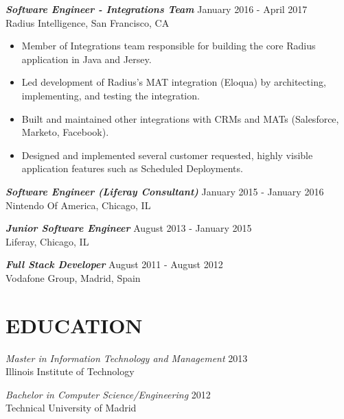 \documentclass[overlapped, 10pt]{res} %
\begin{document}
\begin{resume}
{\sl \textbf{Software Engineer - Integrations Team}} \hfill January 2016 - April 2017 \\
Radius Intelligence, San Francisco, CA
\begin{itemize} \itemsep -2pt %
\item Member of Integrations team responsible for building the core Radius application in Java and Jersey.
\item Led development of Radius’s MAT integration (Eloqua) by architecting, implementing, and testing the integration.
\item Built and maintained other integrations with CRMs and MATs (Salesforce, Marketo, Facebook).
\item Designed and implemented several customer requested, highly visible application features such as Scheduled Deployments.
\end{itemize}
 
{\sl \textbf{Software Engineer (Liferay Consultant)}} \hfill January 2015 - January 2016 \\
Nintendo Of America, Chicago, IL

{\sl \textbf{Junior Software Engineer}} \hfill August 2013 - January 2015 \\
Liferay, Chicago, IL

{\sl \textbf{Full Stack Developer}} \hfill August 2011 - August 2012 \\
Vodafone Group, Madrid, Spain

 
\section{EDUCATION}\smallskip

{\sl Master in Information Technology and Management} \hfill 2013 \\
Illinois Institute of Technology

{\sl Bachelor in Computer Science/Engineering} \hfill 2012 \\
Technical University of Madrid

\end{resume}
\end{document}
